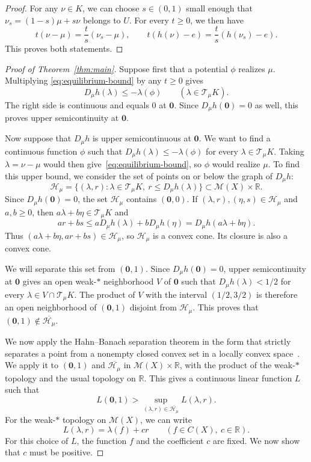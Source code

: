 \documentclass[10pt]{amsart}
\numberwithin{equation}{section}
\newcommand{\R}{\mathbb R}
\newcommand{\CM}{\mathcal M}
\newcommand{\CT}{\mathcal T}
\newcommand{\CH}{\mathcal H}
\newcommand{\zeromeasure}{\mathbf{0}}
\begin{document}
\begin{proof}
For any $\nu\in K$, we can choose $s\in(0,1)$ small enough that
$\nu_s=(1-s)\mu+s\nu$ belongs to $U$. For every $t\geq0$, we then have
\[
 t(\nu-\mu)=\frac{t}{s}(\nu_s-\mu),
 \qquad
 t(h(\nu)-e)=\frac{t}{s}(h(\nu_s)-e).
\]
This proves both statements.
\end{proof}


\begin{proof}[Proof of Theorem~\ref{thm:main}]
Suppose first that a potential $\phi$ realizes $\mu$. Multiplying
\eqref{eq:equilibrium-bound} by any $t\geq0$ gives
\[
 D_\mu h(\lambda)\leq-\lambda(\phi)
 \qquad(\lambda\in\CT_\mu K).
\]
The right side is continuous and equals $0$ at $\zeromeasure$. Since
$D_\mu h(\zeromeasure)=0$ as well, this proves upper semicontinuity at
$\zeromeasure$.

Now suppose that $D_\mu h$ is upper semicontinuous at $\zeromeasure$. We want
to find a continuous function $\phi$ such that
$D_\mu h(\lambda)\leq-\lambda(\phi)$ for every $\lambda\in\CT_\mu K$.
Taking $\lambda=\nu-\mu$ would then give~\eqref{eq:equilibrium-bound},
so $\phi$ would realize $\mu$. To find this upper bound, we consider
the set of points on or below the graph of $D_\mu h$:
\begin{equation}\label{eq:hypograph-cone}
 \CH_\mu=
 \{(\lambda,r):\lambda\in\CT_\mu K,\ r\leq D_\mu h(\lambda)\}
 \subset\CM(X)\times\R.
\end{equation}
Since $D_\mu h(\zeromeasure)=0$, the set $\CH_\mu$ contains $(\zeromeasure,0)$. If
$(\lambda,r),(\eta,s)\in\CH_\mu$ and $a,b\geq0$, then
$a\lambda+b\eta\in\CT_\mu K$ and
\[
 ar+bs\leq aD_\mu h(\lambda)+bD_\mu h(\eta)
 =D_\mu h(a\lambda+b\eta).
\]
Thus $(a\lambda+b\eta,ar+bs)\in\CH_\mu$, so $\CH_\mu$ is a convex
cone. Its closure is also a convex cone.

We will separate this set from $(\zeromeasure,1)$. Since
$D_\mu h(\zeromeasure)=0$, upper semicontinuity at $\zeromeasure$ gives
an open weak\nobreakdash-$*$ neighborhood $V$ of $\zeromeasure$ such that
$D_\mu h(\lambda)<1/2$ for every $\lambda\in V\cap\CT_\mu K$.
The product of $V$ with the interval $(1/2,3/2)$ is therefore an open neighborhood of
$(\zeromeasure,1)$ disjoint from $\CH_\mu$. This proves that
$(\zeromeasure,1)\notin\overline{\CH_\mu}$.

We now apply the Hahn--Banach separation theorem in the form that
strictly separates a point from a nonempty closed convex set in a
locally convex space~\cite[Theorem~3.4(b)]{rudin}. We apply it to
$(\zeromeasure,1)$ and $\overline{\CH_\mu}$ in $\CM(X)\times\R$,
with the product of the weak\nobreakdash-$*$ topology and the usual
topology on $\R$. This gives a continuous linear function $L$ such that
\[
 L(\zeromeasure,1)>\sup_{(\lambda,r)\in\overline{\CH_\mu}}L(\lambda,r).
\]
For the weak\nobreakdash-$*$ topology on $\CM(X)$, we can write
\[
 L(\lambda,r)=\lambda(f)+cr
 \qquad(f\in C(X),\ c\in\R).
\]
For this choice of $L$, the function $f$ and the coefficient $c$ are
fixed. We now show that $c$ must be positive.


\end{proof}
\end{document}
